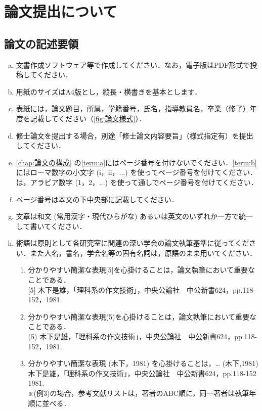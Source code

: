 \chapter{論文提出について}
    \section{論文の記述要領}
        \begin{enumerate}[a.]
            \item 文書作成ソフトウェア等で作成してください．なお，電子版はPDF形式で投稿してください．
            \item 用紙のサイズはA4版とし，縦長・横書きを基本とします．
            \item 表紙には，論文題目，所属，学籍番号，氏名，指導教員名，卒業（修了）年度を記載してください（\cref{fig:論文様式}）．
            \item 修士論文を提出する場合，別途「修士論文内容要旨」（様式指定有）を提出してください．
            \item \cref{chap:論文の構成} の\cref{term:a}にはページ番号を付けないでください．\cref{term:b}にはローマ数字の小文字 (i，ii，...) を使ってページ番号を付けてください．は，アラビア数字 (1，2，...) を使って通しでページ番号を付けてください．
            \item ページ番号は本文の下中央部に記載してください．
            \item 文章は和文 (常用漢字・現代ひらがな) あるいは英文のいずれか一方で統一して書いてください．
            \item 術語は原則として各研究室に関連の深い学会の論文執筆基準に従ってください．また人名，書名，学会名等の固有名詞は，原語のまま用いてください．

                \begin{enumerate}[(例1)]
                    \item
                            分かりやすい簡潔な表現[5]を心掛けることは，論文執筆において重要なことである．\\
                            {[5]} 木下是雄，「理科系の作文技術」，中央公論社　中公新書624，pp.118-152，1981.
                    \item
                            分かりやすい簡潔な表現(5)を心掛けることは，論文執筆において重要なことである．\\
                            (5) 木下是雄，「理科系の作文技術」，中央公論社　中公新書624，pp.118-152，1981.
                    \item \label{例3}
                            分かりやすい簡潔な表現 (木下，1981) を心掛けることは，…
                            (木下,1981)  \\
                            木下是雄，「理科系の作文技術」，中央公論社　中公新書624，pp.118-152 1981.\\
                            ※(例3)の場合，参考文献リストは，著者のABC順に，同一著者は執筆年順に並べる．
                \end{enumerate}


\end{enumerate}
